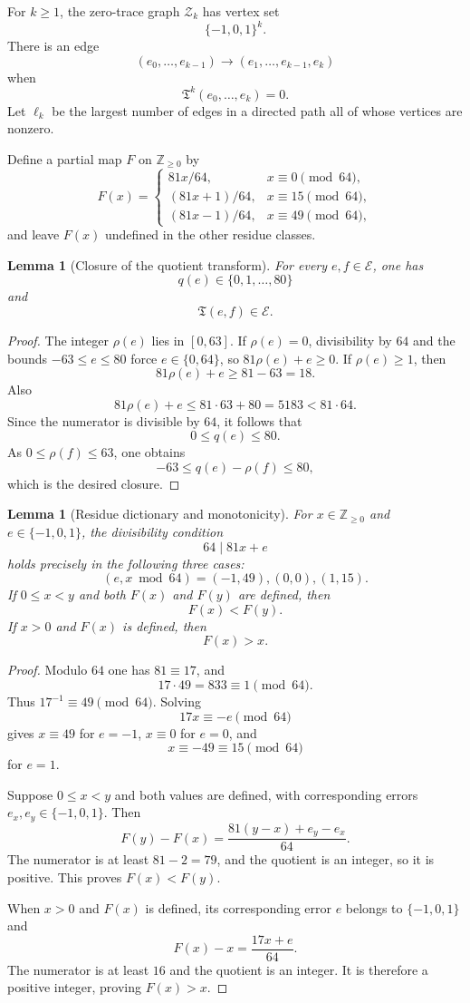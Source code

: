 \documentclass[11pt]{article}
\newtheorem{lemma}[theorem]{Lemma}
\theoremstyle{definition}
\theoremstyle{remark}
\newcommand{\Z}{\mathbb{Z}}
\newcommand{\E}{\mathcal{E}}
\newcommand{\Tq}{\mathfrak{T}}
\begin{document}
For $k\ge 1$, the zero-trace graph $\mathcal Z_k$ has vertex set
\[
\{-1,0,1\}^k.
\]
There is an edge
\[
(e_0,\ldots,e_{k-1})
\longrightarrow
(e_1,\ldots,e_{k-1},e_k)
\]
when
\[
\Tq^k(e_0,\ldots,e_k)=0.
\]
Let $\ell_k$ be the largest number of edges in a directed path all of whose vertices are nonzero.

Define a partial map $F$ on $\Z_{\ge 0}$ by
\[
F(x)=
\begin{cases}
81x/64,&x\equiv 0\pmod{64},\\
(81x+1)/64,&x\equiv 15\pmod{64},\\
(81x-1)/64,&x\equiv 49\pmod{64},
\end{cases}
\]
and leave $F(x)$ undefined in the other residue classes.

\begin{lemma}[Closure of the quotient transform]
\label{lem:closure}
For every $e,f\in\E$, one has
\[
q(e)\in\{0,1,\ldots,80\}
\]
and
\[
\Tq(e,f)\in\E.
\]
\end{lemma}

\begin{proof}
The integer $\rho(e)$ lies in $[0,63]$. If $\rho(e)=0$, divisibility by $64$ and the bounds $-63\le e\le 80$ force $e\in\{0,64\}$, so $81\rho(e)+e\ge 0$. If $\rho(e)\ge 1$, then
\[
81\rho(e)+e\ge 81-63=18.
\]
Also
\[
81\rho(e)+e\le 81\cdot 63+80=5183<81\cdot 64.
\]
Since the numerator is divisible by $64$, it follows that
\[
0\le q(e)\le 80.
\]
As $0\le\rho(f)\le63$, one obtains
\[
-63\le q(e)-\rho(f)\le80,
\]
which is the desired closure.
\end{proof}

\begin{lemma}[Residue dictionary and monotonicity]
\label{lem:residue-dictionary}
For $x\in\Z_{\ge0}$ and $e\in\{-1,0,1\}$, the divisibility condition
\[
64\mid 81x+e
\]
holds precisely in the following three cases:
\[
(e,x\bmod64)=(-1,49),(0,0),(1,15).
\]
If $0\le x<y$ and both $F(x)$ and $F(y)$ are defined, then
\[
F(x)<F(y).
\]
If $x>0$ and $F(x)$ is defined, then
\[
F(x)>x.
\]
\end{lemma}

\begin{proof}
Modulo $64$ one has $81\equiv17$, and
\[
17\cdot49=833\equiv1\pmod{64}.
\]
Thus $17^{-1}\equiv49\pmod{64}$. Solving
\[
17x\equiv-e\pmod{64}
\]
gives $x\equiv49$ for $e=-1$, $x\equiv0$ for $e=0$, and
\[
x\equiv-49\equiv15\pmod{64}
\]
for $e=1$.

Suppose $0\le x<y$ and both values are defined, with corresponding errors $e_x,e_y\in\{-1,0,1\}$. Then
\[
F(y)-F(x)=\frac{81(y-x)+e_y-e_x}{64}.
\]
The numerator is at least $81-2=79$, and the quotient is an integer, so it is positive. This proves $F(x)<F(y)$.

When $x>0$ and $F(x)$ is defined, its corresponding error $e$ belongs to $\{-1,0,1\}$ and
\[
F(x)-x=\frac{17x+e}{64}.
\]
The numerator is at least $16$ and the quotient is an integer. It is therefore a positive integer, proving $F(x)>x$.
\end{proof}
\end{document}
